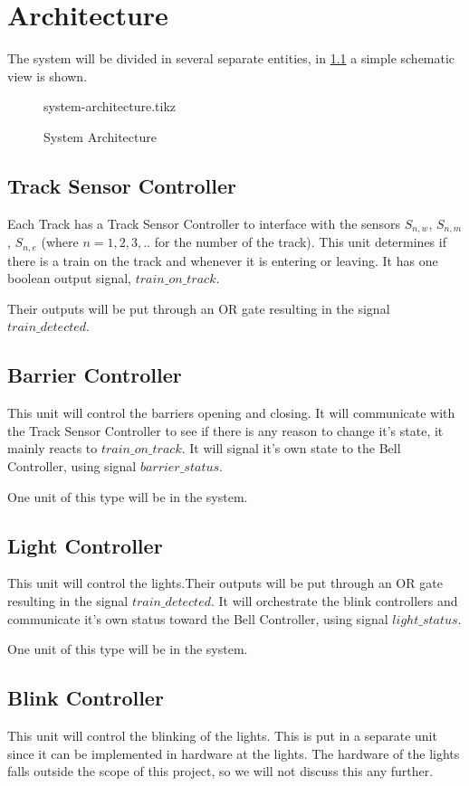 \documentclass[final]{report}
\begin{document}
\chapter{Architecture}
The system will be divided in several separate entities, in \cref{fig:system-architecture} a simple schematic view is shown.

\begin{figure}[H]
	\centering
	{system-architecture.tikz}
	\caption{System Architecture}
	\label{fig:system-architecture}
\end{figure}
\section{Track Sensor Controller}
Each Track has a Track Sensor Controller to interface with the sensors $S_{n,w}$, $S_{n,m}$, $S_{n,e}$ (where $n = 1,2,3,..$ for the number of the track).
This unit determines if there is a train on the track and whenever it is entering or leaving.
It has one boolean output signal, $train\_on\_track$.

Their outputs will be put through an OR gate resulting in the signal $train\_detected$.
\section{Barrier Controller}
This unit will control the barriers opening and closing.
It will communicate with the Track Sensor Controller to see if there is any reason to change it's state, it mainly reacts to $train\_on\_track$.
It will signal it's own state to the Bell Controller, using signal $barrier\_status$.

One unit of this type will be in the system.
\section{Light Controller}
This unit will control the lights.Their outputs will be put through an OR gate resulting in the signal $train\_detected$.
It will orchestrate the blink controllers and communicate it's own status toward the Bell Controller, using signal $light\_status$.

One unit of this type will be in the system.
\section{Blink Controller}
This unit will control the blinking of the lights.
This is put in a separate unit since it can be implemented in hardware at the lights.
The hardware of the lights falls outside the scope of this project, so we will not discuss this any further.
\end{document}
